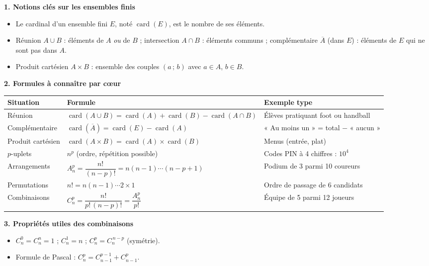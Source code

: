 \documentclass[11pt]{article}
\newcommand{\cle}[1]{{\popxbold\color{popdark}#1}}
\begin{document}
\begin{bilan}
\textbf{1. Notions clés sur les ensembles finis}
\begin{itemize}
\item Le \cle{cardinal} d'un ensemble fini $E$, noté $\operatorname{card}(E)$, est le nombre de ses éléments.
\item \cle{Réunion} $A\cup B$ : éléments de $A$ \emph{ou} de $B$ ; \cle{intersection} $A\cap B$ : éléments communs ; \cle{complémentaire} $\overline{A}$ (dans $E$) : éléments de $E$ qui ne sont pas dans $A$.
\item \cle{Produit cartésien} $A\times B$ : ensemble des couples $(a\,;\,b)$ avec $a\in A$, $b\in B$.
\end{itemize}

\textbf{2. Formules à connaître par cœur}
\begin{center}
\begin{tabularx}{\linewidth}{|l|X|X|}\hline
\rowcolor{popblueL} \textbf{Situation} & \textbf{Formule} & \textbf{Exemple type} \\ \hline
Réunion & $\operatorname{card}(A\cup B)=\operatorname{card}(A)+\operatorname{card}(B)-\operatorname{card}(A\cap B)$ & Élèves pratiquant foot ou handball \\ \hline
Complémentaire & $\operatorname{card}(\overline{A})=\operatorname{card}(E)-\operatorname{card}(A)$ & « Au moins un » = total $-$ « aucun » \\ \hline
Produit cartésien & $\operatorname{card}(A\times B)=\operatorname{card}(A)\times\operatorname{card}(B)$ & Menus (entrée, plat) \\ \hline
$p$-uplets & $n^p$ (ordre, répétition possible) & Codes PIN à 4 chiffres : $10^4$ \\ \hline
Arrangements & $A_n^p=\dfrac{n!}{(n-p)!}=n(n-1)\cdots(n-p+1)$ & Podium de 3 parmi 10 coureurs \\ \hline
Permutations & $n!=n(n-1)\cdots 2\times 1$ & Ordre de passage de 6 candidats \\ \hline
Combinaisons & $C_n^p=\dfrac{n!}{p!\,(n-p)!}=\dfrac{A_n^p}{p!}$ & Équipe de 5 parmi 12 joueurs \\ \hline
\end{tabularx}
\end{center}

\textbf{3. Propriétés utiles des combinaisons}
\begin{itemize}
\item $C_n^0=C_n^n=1$ ; \quad $C_n^1=n$ ; \quad $C_n^p=C_n^{\,n-p}$ (symétrie).
\item Formule de Pascal : $C_n^p=C_{n-1}^{p-1}+C_{n-1}^{p}$.
\end{itemize}


\end{bilan}
\end{document}

